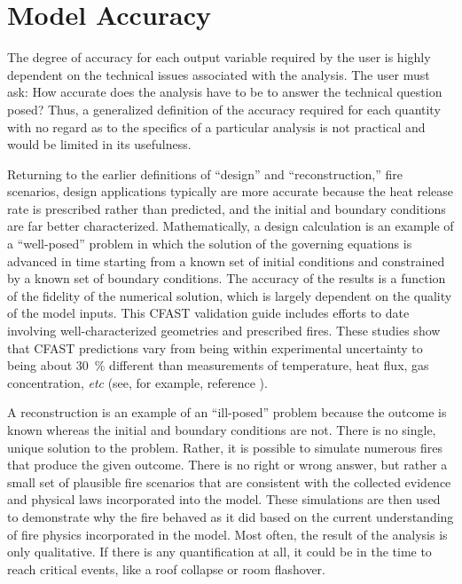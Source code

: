 \section{Model Accuracy}

The degree of  accuracy for each output variable  required by the user is  highly  dependent on  the  technical  issues  associated with  the analysis.  The user  must ask: How accurate does  the analysis have to be  to  answer  the  technical  question posed?  Thus,  a  generalized definition of the  accuracy required for each quantity  with no regard as  to the specifics  of a  particular analysis  is not  practical and would be limited in its usefulness.

Returning   to    the   earlier   definitions    of   ``design''   and ``reconstruction,'' fire scenarios, design applications  typically are  more accurate because the heat release rate is prescribed rather than predicted, and the    initial    and    boundary    conditions   are    far    better characterized. Mathematically, a design calculation is an example of a ``well-posed''  problem  in  which   the  solution  of  the  governing equations is  advanced in  time starting from  a known set  of initial conditions and constrained by a known set of boundary conditions.  The accuracy of the results is a function of the fidelity of the numerical solution, which is  largely dependent on the quality of the model inputs. This CFAST validation guide includes efforts to date involving well-characterized geometries and prescribed fires. These studies show that  CFAST predictions vary from being within experimental   uncertainty  to  being   about  30~\%   different  than measurements of temperature, heat flux, gas concentration, {\em etc} (see, for example, reference \cite{NRCNUREG1824_CFAST}).

A reconstruction is an example of an ``ill-posed'' problem because the outcome  is known  whereas  the initial  and  boundary conditions  are not. There is  no single, unique solution to the  problem. Rather, it is possible to simulate numerous fires that produce the given outcome. There is no right or wrong answer, but rather a small set of plausible fire scenarios that are  consistent with the collected evidence and physical laws incorporated into the model. These simulations are then used to demonstrate why the fire behaved as it did  based on the current understanding of fire physics  incorporated in  the model.  Most  often, the  result of  the
analysis is only  qualitative. If there is any  quantification at all, it could be in the time to reach critical events, like a roof collapse or room flashover.

